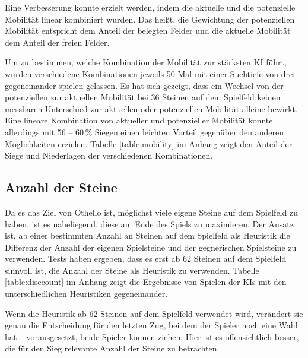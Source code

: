 Eine Verbesserung konnte erzielt werden, indem die aktuelle und die potenzielle Mobilität linear kombiniert wurden.
Das heißt, die Gewichtung der potenziellen Mobilität entspricht dem Anteil der belegten Felder und die aktuelle Mobilität
dem Anteil der freien Felder.

Um zu bestimmen, welche Kombination der Mobilität zur stärksten KI führt, wurden verschiedene Kombinationen jeweils 50
Mal mit einer Suchtiefe von drei gegeneinander spielen gelassen. Es hat sich gezeigt, dass ein Wechsel von der potenziellen zur aktuellen Mobilität bei 36 Steinen auf dem Spielfeld keinen messbaren Unterschied zur aktuellen oder potenziellen Mobilität alleine bewirkt. Eine lineare Kombination von aktueller und potenzieller Mobilität konnte allerdings mit 56 – 60\,\% Siegen einen leichten Vorteil gegenüber den anderen Möglichkeiten erzielen.
Tabelle \ref{table:mobility} im Anhang zeigt den Anteil der Siege und Niederlagen der verschiedenen Kombinationen.

\subsection{Anzahl der Steine}
Da es das Ziel von Othello ist, möglichst viele eigene Steine auf dem Spielfeld zu haben, ist es naheliegend, diese am
Ende des Spiels zu maximieren. Der Ansatz ist, ab einer bestimmten Anzahl an Steinen auf dem Spielfeld als Heuristik die
Differenz der Anzahl der eigenen Spielsteine und der gegnerischen Spielsteine zu verwenden. Tests haben ergeben, dass es
erst ab 62 Steinen auf dem Spielfeld sinnvoll ist, die Anzahl der Steine als Heuristik zu verwenden. Tabelle
\ref{table:disccount} im Anhang zeigt die Ergebnisse von Spielen der KIs mit den unterschiedlichen Heuristiken
gegeneinander.

Wenn die Heuristik ab 62 Steinen auf dem Spielfeld verwendet wird, verändert sie genau die Entscheidung für den letzten
Zug, bei dem der Spieler noch eine Wahl hat – vorausgesetzt, beide Spieler können ziehen. Hier ist es offensichtlich besser, die für den Sieg relevante Anzahl der Steine zu betrachten.
